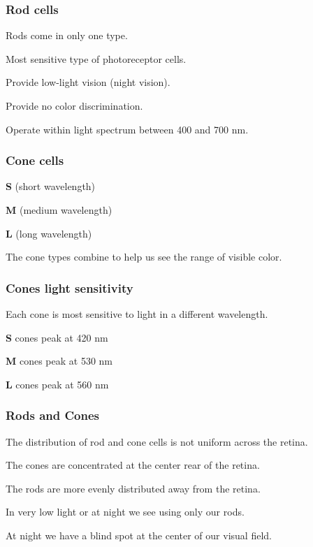 \documentclass[12pt]{beamer}\usepackage[]{graphicx}\usepackage[]{color}
\begin{document}
\begin{frame}
\frametitle{Rod cells}

\bbi
  \item Rods come in only one type.
  \item Most sensitive type of photoreceptor cells.
  \item Provide low-light vision (night vision).
  \item Provide no color discrimination.
  \item Operate within light spectrum between 400 and 700 nm.
\ei

\end{frame}


\begin{frame}
\frametitle{Cone cells}

\bbi
  \item \textbf{S} (short wavelength)
  \item \textbf{M} (medium wavelength)
  \item \textbf{L} (long wavelength)
  \item The cone types combine to help us see the range of visible color.
\ei
\eb

\end{frame}


\begin{frame}
\frametitle{Cones light sensitivity}

\bbi
  \item Each cone is most sensitive to light in a different wavelength.
  \item \textbf{S} cones peak at 420 nm
  \item \textbf{M} cones peak at 530 nm
  \item \textbf{L} cones peak at 560 nm
\ei
\eb

\end{frame}


\begin{frame}
\frametitle{Rods and Cones}

\bbi
  \item The distribution of rod and cone cells is not uniform across the retina.
  \item The cones are concentrated at the center rear of the retina.
  \item The rods are more evenly distributed away from the retina.
  \item In very low light or at night we see using only our rods.
  \item At night we have a blind spot at the center of our visual field.
\ei

\end{frame}
\end{document}
